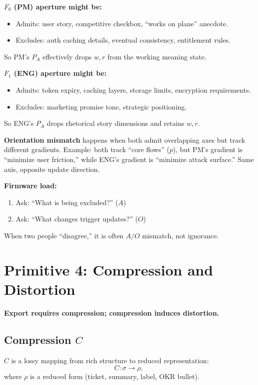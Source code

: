 \documentclass[11pt]{article}
\begin{document}
\textbf{$F_0$ (PM) aperture might be:}
\begin{itemize}[leftmargin=2em]
  \item Admits: user story, competitive checkbox, ``works on plane'' anecdote.
  \item Excludes: auth caching details, eventual consistency, entitlement rules.
\end{itemize}
So PM's $P_A$ effectively drops $w,r$ from the working meaning state.

\textbf{$F_1$ (ENG) aperture might be:}
\begin{itemize}[leftmargin=2em]
  \item Admits: token expiry, caching layers, storage limits, encryption requirements.
  \item Excludes: marketing promise tone, strategic positioning.
\end{itemize}
So ENG's $P_A$ drops rhetorical story dimensions and retains $w,r$.

\textbf{Orientation mismatch} happens when both admit overlapping axes but track different gradients. Example: both track ``core flows'' ($p$), but PM's gradient is ``minimize user friction,'' while ENG's gradient is ``minimize attack surface.'' Same axis, opposite update direction.

\textbf{Firmware load:}
\begin{enumerate}[leftmargin=2em]
  \item Ask: ``What is being excluded?'' ($A$)
  \item Ask: ``What changes trigger updates?'' ($O$)
\end{enumerate}
When two people ``disagree,'' it is often $A/O$ mismatch, not ignorance.

\section{Primitive 4: Compression and Distortion}

\textbf{Export requires compression; compression induces distortion.}

\subsection{Compression $C$}

$C$ is a lossy mapping from rich structure to reduced representation:
\[
  C:\sigma \rightarrow \rho,
\]
where $\rho$ is a reduced form (ticket, summary, label, OKR bullet).
\end{document}

